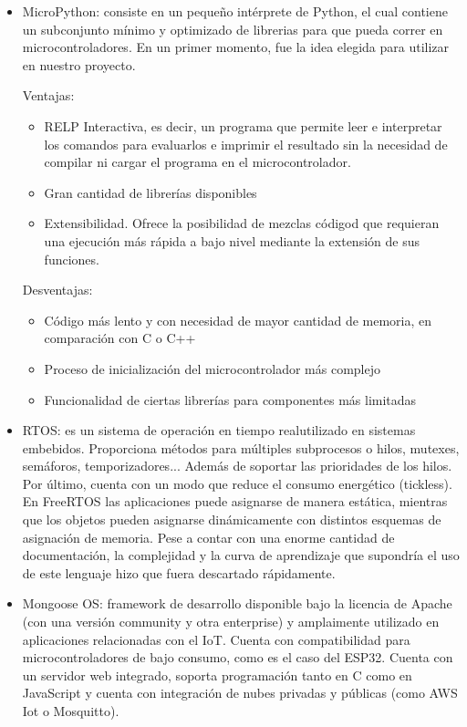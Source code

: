 \documentclass[runningheads]{llncs}
\begin{document}
\begin{itemize}
    \item MicroPython: consiste en un pequeño intérprete de Python, el cual contiene un subconjunto mínimo y optimizado de librerias para que pueda correr en microcontroladores.
    En un primer momento, fue la idea elegida para utilizar en nuestro proyecto.
    
    Ventajas:
    \begin{itemize}
        \item RELP Interactiva, es decir, un programa que permite leer e interpretar los comandos para evaluarlos e imprimir el resultado sin la necesidad de compilar ni cargar el programa en el microcontrolador.
        \item Gran cantidad de librerías disponibles
        \item Extensibilidad. Ofrece la posibilidad de mezclas códigod que requieran una ejecución más rápida a bajo nivel mediante la extensión de sus funciones.
    \end{itemize}
    
    Desventajas:
    \begin{itemize}
        \item Código más lento y con necesidad de mayor cantidad de memoria, en comparación con C o C++
        \item Proceso de inicialización del microcontrolador más complejo
        \item Funcionalidad de ciertas librerías para componentes más limitadas
    \end{itemize}
     
    \item RTOS: es un sistema de operación en tiempo realutilizado en sistemas embebidos. Proporciona métodos para múltiples subprocesos o hilos, mutexes, semáforos, temporizadores... Además de soportar las prioridades de los hilos. Por último, cuenta con un modo que reduce el consumo energético (tickless). En FreeRTOS las aplicaciones puede asignarse de manera estática, mientras que los objetos pueden asignarse dinámicamente con distintos esquemas de asignación de memoria. 
    Pese a contar con una enorme cantidad de documentación, la complejidad y la curva de aprendizaje que supondría el uso de este lenguaje hizo que fuera descartado rápidamente.
    
    \item Mongoose OS: framework de desarrollo disponible bajo la licencia de Apache (con una versión community y otra enterprise) y amplaimente utilizado en aplicaciones relacionadas con el IoT. Cuenta con compatibilidad para microcontroladores de bajo consumo, como es el caso del ESP32. Cuenta con un servidor web integrado, soporta programación tanto en C como en JavaScript y cuenta con integración de nubes privadas y públicas (como AWS Iot o Mosquitto).
    

\end{itemize}
\end{document}
